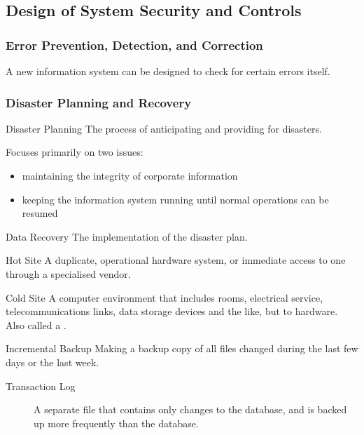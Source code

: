 \documentclass[\main/notes.tex]{subfiles}
\begin{document}
			\subsection{Design of System Security and Controls}
				\subsubsection{Error Prevention, Detection, and Correction}
					A new information system can be designed to check for certain errors itself.
				\subsubsection{Disaster Planning and Recovery}
					\begin{definition}{Disaster Planning}
						The process of anticipating and providing for disasters.

						Focuses primarily on two issues:
						\begin{itemize}[nosep]
							\item maintaining the integrity of corporate information
							\item keeping the information system running until normal operations can be resumed
						\end{itemize}
					\end{definition}
					\begin{definition}{Data Recovery}
						The implementation of the disaster plan.
					\end{definition}
					\begin{definition}{Hot Site}
						A duplicate, operational hardware system, or immediate access to one through a specialised vendor.
					\end{definition}
					\begin{definition}{Cold Site}
						A computer environment that includes rooms, electrical service, telecommunications links, data storage devices and the like, but to hardware. Also called a .
					\end{definition}
					\begin{definition}{Incremental Backup}
						Making a backup copy of all files changed during the last few days or the last week.
						\begin{indentparagraph}
							\begin{description}
								\item[Transaction Log] A separate file that contains only changes to the database, and is backed up more frequently than the database.
							\end{description}
						\end{indentparagraph}
					\end{definition}
\end{document}
